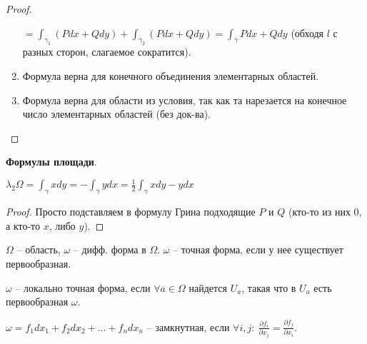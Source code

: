 \begin{proof}
\begin{enumerate}
{            $= \int_{\gamma_1} { \left(P dx + Q dy\right) } + \int_{\gamma_2} { \left(P dx + Q dy\right) } = \int_{\gamma} { P dx + Q dy }$ (обходя $l$ с разных сторон, слагаемое сократится).
        }
        \item {
            Формула верна для конечного объединения элементарных областей.
        }
        \item {
            Формула верна для области из условия, так как та нарезается на конечное число элементарных областей (без док-ва).
        }
    \end{enumerate}
\end{proof}
\begin{consequence} \textbf{Формулы площади}.

    $\lambda_2 \Omega = \int_{\gamma} { xdy } = - \int_{\gamma}{y d x} = \frac{1}{2} \int_{\gamma} { xdy - ydx }$
\end{consequence}
\begin{proof}
    Просто подставляем в формулу Грина подходящие $P$ и $Q$ (кто-то из них $0$, а кто-то $x$, либо $y$).
\end{proof}


\begin{definition}
    $\Omega$ -- область, $\omega$ -- дифф. форма в $\Omega$. $\omega$ -- точная форма, если у нее существует первообразная.
\end{definition}
\begin{definition}
    $\omega$ -- локально точная форма, если $\forall a \in \Omega$ найдется $U_a$, такая что в $U_a$ есть первообразная $\omega$.
\end{definition}
\begin{definition}
    $\omega = f_1 d x_1 + f_2 d x_2 + \dots + f_n d x_n$ -- замкнутная, если $\forall i, j: \ \frac{\partial f_i}{\partial x_j} = \frac{\partial f_j}{\partial x_i}$.
\end{definition}

